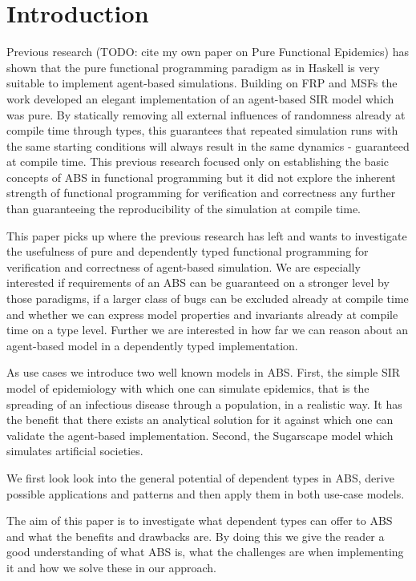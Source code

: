 \section{Introduction}
Previous research (TODO: cite my own paper on Pure Functional Epidemics) has shown that the pure functional programming paradigm as in Haskell is very suitable to implement agent-based simulations. Building on FRP and MSFs the work developed an elegant implementation of an agent-based SIR model which was pure. By statically removing all external influences of randomness already at compile time through types, this guarantees that repeated simulation runs with the same starting conditions will always result in the same dynamics - guaranteed at compile time. This previous research focused only on establishing the basic concepts of ABS in functional programming but it did not explore the inherent strength of functional programming for verification and correctness any further than guaranteeing the reproducibility of the simulation at compile time.

This paper picks up where the previous research has left and wants to investigate the usefulness of pure and dependently typed functional programming for verification and correctness of agent-based simulation. We are especially interested if requirements of an ABS can be guaranteed on a stronger level by those paradigms, if a larger class of bugs can be excluded already at compile time and whether we can express model properties and invariants already at compile time on a type level. Further we are interested in how far we can reason about an agent-based model in a dependently typed implementation. 

As use cases we introduce two well known models in ABS. First, the simple SIR model of epidemiology \cite{kermack_contribution_1927} with which one can simulate epidemics, that is the spreading of an infectious disease through a population, in a realistic way. It has the benefit that there exists an analytical solution for it against which one can validate the agent-based implementation.
Second, the Sugarscape model \cite{epstein_growing_1996} which simulates artificial societies.

We first look look into the general potential of dependent types in ABS, derive possible applications and patterns and then apply them in both use-case models.

The aim of this paper is to investigate what dependent types can offer to ABS and what the benefits and drawbacks are. By doing this we give the reader a good understanding of what ABS is, what the challenges are when implementing it and how we solve these in our approach.

